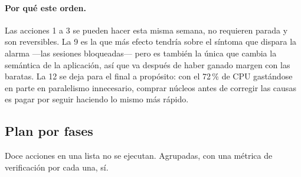 \documentclass[11pt,a4paper]{article}
\begin{document}
\paragraph{Por qué este orden.} Las acciones 1 a 3 se pueden hacer esta misma
semana, no requieren parada y son reversibles. La 9 es la que más efecto
tendría sobre el síntoma que dispara la alarma —las sesiones bloqueadas— pero
es también la única que cambia la semántica de la aplicación, así que va
después de haber ganado margen con las baratas. La 12 se deja para el final a
propósito: con el 72\,\% de CPU gastándose en parte en paralelismo
innecesario, comprar núcleos antes de corregir las causas es pagar por
seguir haciendo lo mismo más rápido.

\subsection{Plan por fases}

Doce acciones en una lista no se ejecutan. Agrupadas, con una métrica de
verificación por cada una, sí.
\end{document}
